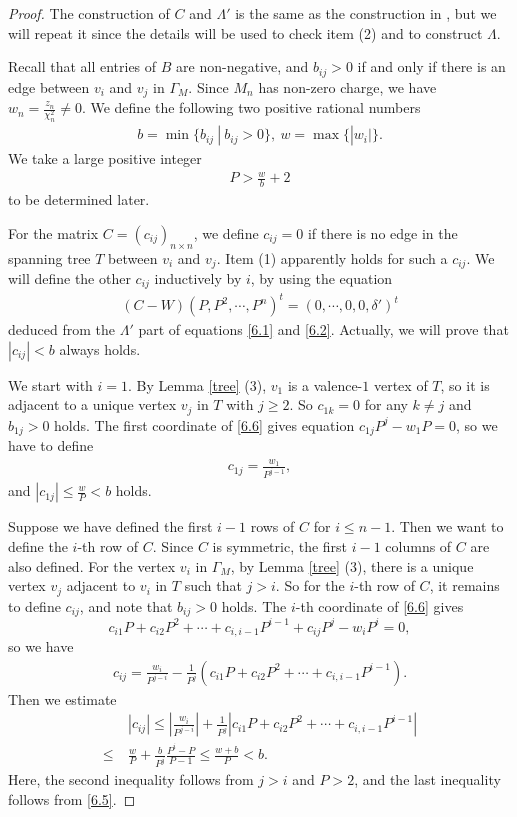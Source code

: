 \documentclass{amsart}
\numberwithin{equation}{section}
\theoremstyle{definition}
\begin{document}
\begin{proof}
The construction of $C$ and $\Lambda'$ is the same as the construction in \cite[Lemma 3.2]{WY}, but we will repeat it since the details will be used to check item (2) and to construct $\Lambda$.

Recall that all entries of $B$ are non-negative, and $b_{ij}>0$ if and only if there is an edge between $v_i$ and $v_j$ in $\Gamma_M$. Since $M_n$ has non-zero charge, we have $w_n=\frac{z_n}{\chi_n^2}\ne 0$. We define the following two positive rational numbers 
\begin{align}\label{6.4}
b=\min\{b_{ij}\ |\ b_{ij}>0\},\ w=\max\{|w_i|\}.
\end{align}
We take a large positive integer 
\begin{align}\label{6.5}
P>\frac{w}{b}+2
\end{align} to be determined later.

For the matrix $C=(c_{ij})_{n\times n}$, we define $c_{ij}= 0$ if there is no edge in the spanning tree $T$ between $v_i$ and $v_j$. Item (1) apparently holds for such a $c_{ij}$. We will define the other $c_{ij}$ inductively by $i$, by using the equation 
\begin{align}\label{6.6}
(C-W)(P,P^2,\cdots,P^n)^t=(0,\cdots,0,0,\delta')^t
\end{align}
deduced from the $\Lambda'$ part of equations \eqref{6.1} and \eqref{6.2}. Actually, we will prove that $|c_{ij}|<b$ always holds.

We start with $i=1$. By Lemma \ref{tree} (3), $v_1$ is a valence-$1$ vertex of $T$, so it is adjacent to a unique vertex $v_j$ in $T$ with $j\geq 2$. So $c_{1k}=0$ for any $k\ne j$ and $b_{1j}>0$ holds. The first coordinate of \eqref{6.6} gives equation $c_{1j}P^j-w_1P=0$, so we have to define
\begin{align}\label{6.7}
c_{1j}=\frac{w_1}{P^{j-1}},
\end{align} 
and $|c_{1j}|\leq \frac{w}{P}<b$ holds.

Suppose we have defined the first $i-1$ rows of $C$ for $i\leq n-1$. Then we want to define the $i$-th row of $C$. Since $C$ is symmetric, the first $i-1$ columns of $C$ are also defined. For the vertex $v_i$ in $\Gamma_M$, by Lemma \ref{tree} (3), there is a unique vertex $v_j$ adjacent to $v_i$ in $T$ such that $j>i$. So for the $i$-th row of $C$, it remains to define $c_{ij}$, and note that $b_{ij}>0$ holds. The $i$-th coordinate of \eqref{6.6} gives
$$c_{i1}P+c_{i2}P^2+\cdots +c_{i,i-1}P^{i-1}+c_{ij}P^j-w_iP^i=0,$$ so we have 
\begin{align}\label{6.8}
c_{ij}=\frac{w_i}{P^{j-i}}-\frac{1}{P^j}(c_{i1}P+c_{i2}P^2+\cdots +c_{i,i-1}P^{i-1}).
\end{align}
Then we estimate 
\begin{align*}
& |c_{ij}|\leq |\frac{w_i}{P^{j-i}}|+\frac{1}{P^j}|c_{i1}P+c_{i2}P^2+\cdots +c_{i,i-1}P^{i-1}|\\
\leq \ & \frac{w}{P}+\frac{b}{P^j}\frac{P^i-P}{P-1}\leq \frac{w+b}{P}< b.
\end{align*}
Here, the second inequality follows from $j>i$ and $P>2$, and the last inequality follows from \eqref{6.5}.


\end{proof}
\end{document}
